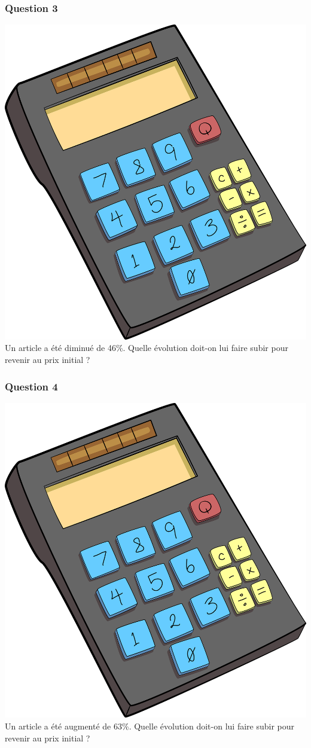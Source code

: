 \documentclass[15pt, mathserif]{beamer}
\begin{document}
\begin{frame} 
	\frametitle{Question 3}
 \includegraphics[scale=0.01]{calculatrice} Un article a été diminué de 46\%. Quelle évolution doit-on lui faire subir pour revenir au prix initial ? \end{frame}


\begin{frame} 
	\frametitle{Question 4}
 \includegraphics[scale=0.01]{calculatrice} Un article a été augmenté de 63\%. Quelle évolution doit-on lui faire subir pour revenir au prix initial ? \end{frame}
\end{document}
